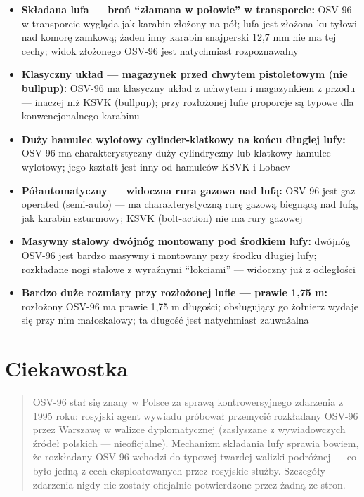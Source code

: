 \documentclass[12pt,openany,oneside]{book}
\providecommand{\tightlist}{%
  \setlength{\itemsep}{0pt}\setlength{\parskip}{0pt}}
\begin{document}
\begin{itemize}
\tightlist
\item
  \textbf{Składana lufa --- broń ``złamana w połowie'' w transporcie:}
  OSV-96 w transporcie wygląda jak karabin złożony na pół; lufa jest
  złożona ku tyłowi nad komorę zamkową; żaden inny karabin snajperski
  12,7 mm nie ma tej cechy; widok złożonego OSV-96 jest natychmiast
  rozpoznawalny
\item
  \textbf{Klasyczny układ --- magazynek przed chwytem pistoletowym (nie
  bullpup):} OSV-96 ma klasyczny układ z uchwytem i magazynkiem z przodu
  --- inaczej niż KSVK (bullpup); przy rozłożonej lufie proporcje są
  typowe dla konwencjonalnego karabinu
\item
  \textbf{Duży hamulec wylotowy cylinder-klatkowy na końcu długiej
  lufy:} OSV-96 ma charakterystyczny duży cylindryczny lub klatkowy
  hamulec wylotowy; jego kształt jest inny od hamulców KSVK i Lobaev
\item
  \textbf{Półautomatyczny --- widoczna rura gazowa nad lufą:} OSV-96
  jest gaz-operated (semi-auto) --- ma charakterystyczną rurę gazową
  biegnącą nad lufą, jak karabin szturmowy; KSVK (bolt-action) nie ma
  rury gazowej
\item
  \textbf{Masywny stalowy dwójnóg montowany pod środkiem lufy:} dwójnóg
  OSV-96 jest bardzo masywny i montowany przy środku długiej lufy;
  rozkładane nogi stalowe z wyraźnymi ``łokciami'' --- widoczny już z
  odległości
\item
  \textbf{Bardzo duże rozmiary przy rozłożonej lufie --- prawie 1,75 m:}
  rozłożony OSV-96 ma prawie 1,75 m długości; obsługujący go żołnierz
  wydaje się przy nim małoskalowy; ta długość jest natychmiast
  zauważalna
\end{itemize}

\section{Ciekawostka}\label{ciekawostka-66}

\begin{quote}
OSV-96 stał się znany w Polsce za sprawą kontrowersyjnego zdarzenia z
1995 roku: rosyjski agent wywiadu próbował przemycić rozkładany OSV-96
przez Warszawę w walizce dyplomatycznej (zasłyszane z wywiadowczych
źródeł polskich --- nieoficjalne). Mechanizm składania lufy sprawia
bowiem, że rozkładany OSV-96 wchodzi do typowej twardej walizki
podróżnej --- co było jedną z cech eksploatowanych przez rosyjskie
służby. Szczegóły zdarzenia nigdy nie zostały oficjalnie potwierdzone
przez żadną ze stron.
\end{quote}
\end{document}
